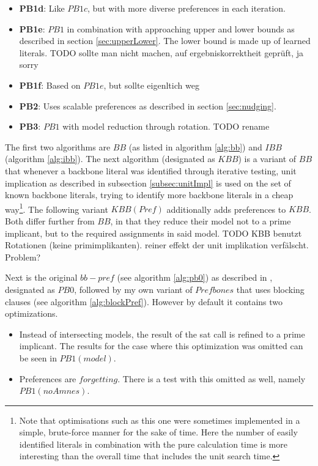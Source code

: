 \begin{itemize}
\item \textbf{PB1d}: Like $PB1c$, but with more diverse preferences in each iteration.
\item \textbf{PB1e}: $PB1$ in combination with approaching upper and lower bounds as described in section \ref{sec:upperLower}. The lower bound is made up of learned literals. TODO sollte man nicht machen, auf ergebniskorrektheit geprüft, ja sorry
\item \textbf{PB1f}: Based on $PB1e$, but sollte eigenltich weg
\item \textbf{PB2}: Uses scalable preferences as described in section \ref{sec:nudging}.
\item \textbf{PB3}: $PB1$ with model reduction through rotation. TODO rename
\end{itemize}


\iffalse




The first two algorithms are $BB$ (as listed in algorithm \ref{alg:bb}) and $IBB$ (algorithm \ref{alg:ibb}). The next algorithm (designated as $KBB$) is a variant of $BB$ that whenever a backbone literal was identified through iterative testing, unit implication as described in subsection \ref{subsec:unitImpl} is used on the set of known backbone literals, trying to identify more backbone literals in a cheap way\footnote{
	Note that optimisations such as this one were sometimes implemented in a simple, brute-force manner for the sake of time. Here the number of easily identified literals in combination with the pure calculation time is more interesting than the overall time that includes the unit search time.
}. 
The following variant $KBB(Pref)$ additionally adds preferences to $KBB$. Both differ further from $BB$, in that they reduce their model not to a prime implicant, but to the required assignments in said model.
TODO KBB benutzt Rotationen (keine primimplikanten). reiner effekt der unit implikation verfälscht. Problem?

Next is the original $bb-pref$ (see algorithm \ref{alg:pb0}) as described in \cite{PJ18}, designated as $PB0$, followed by my own variant of $Prefbones$ that uses blocking clauses (see algorithm \ref{alg:blockPref}). However by default it contains two optimizations.
\begin{itemize}
\item Instead of intersecting models, the result of the sat call is refined to a prime implicant. The results for the case where this optimization was omitted can be seen in $PB1(model)$.
\item Preferences are $forgetting$. There is a test with this omitted as well, namely $PB1(noAmnes)$.
\end{itemize}

